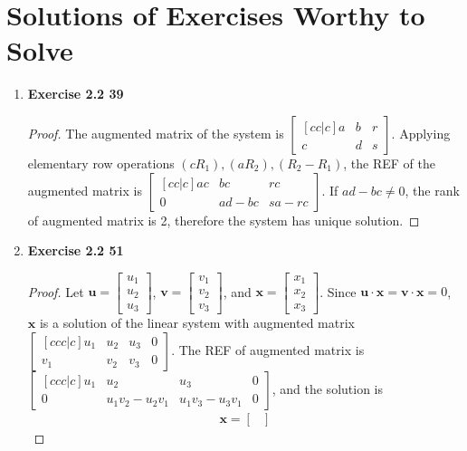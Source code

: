 \section{Solutions of Exercises Worthy to Solve}
\begin{enumerate}
	\item \textbf{Exercise 2.2 39}
	\begin{proof}
		The augmented matrix of the system is $\begin{bmatrix}[cc|c]
			a & b & r \\ c & d & s
		\end{bmatrix}$. Applying elementary row operations $(cR_1), (aR_2), (R_2 - R_1)$, the REF of the augmented matrix is $\begin{bmatrix}[cc|c]
			ac & bc & rc \\ 0 & ad - bc & sa - rc
		\end{bmatrix}$. If $ad - bc \neq 0$, the rank of augmented matrix is 2, therefore the system has unique solution.
	\end{proof}
	\item \textbf{Exercise 2.2 51}
	\begin{proof}
		Let $\textbf{u} = \begin{bmatrix}
			u_1 \\ u_2 \\ u_3
		\end{bmatrix}$, $\textbf{v} = \begin{bmatrix}
			v_1 \\ v_2 \\ v_3
		\end{bmatrix}$, and $\textbf{x} = \begin{bmatrix}
			x_1 \\ x_2 \\ x_3
		\end{bmatrix}$. Since $\textbf{u}\cdot\textbf{x} = \textbf{v}\cdot\textbf{x} = 0$, $\textbf{x}$ is a solution of the linear system with augmented matrix $\begin{bmatrix} [ccc|c]
			u_1 & u_2 & u_3 & 0 \\ v_1 & v_2 & v_3 & 0
		\end{bmatrix}$. The REF of augmented matrix is $\begin{bmatrix} [ccc|c]
			u_1 & u_2 & u_3 & 0 \\ 0 & u_1v_2-u_2v_1 & u_1v_3-u_3v_1 & 0
		\end{bmatrix}$, and the solution is
		\begin{align*}
			\textbf{x} = \begin{bmatrix}

\end{bmatrix}
\end{align*}
\end{proof}
\end{enumerate}
